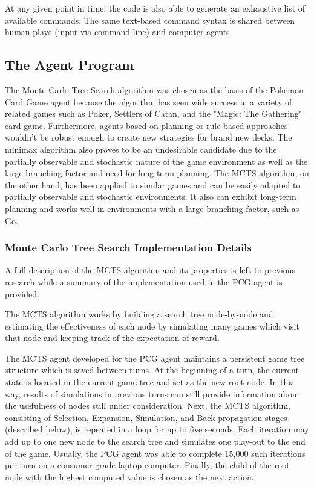 \documentclass{article}
\begin{document}
At any given point in time, the code is also able to generate an exhaustive list of available commands.  The same text-based command syntax is shared between human plays (input via command line) and computer agents

\subsection{The Agent Program} %
The Monte Carlo Tree Search algorithm was chosen as the basis of the Pokemon Card Game agent because the algorithm has seen wide success in a variety of related games such as Poker, Settlers of Catan, and the "Magic: The Gathering" card game. Furthermore, agents based on planning or rule-based approaches wouldn't be robust enough to create new strategies for brand new decks. The minimax algorithm also proves to be an undesirable candidate due to the partially observable and stochastic nature of the game environment as well as the large branching factor and need for long-term planning. The MCTS algorithm, on the other hand, has been applied to similar games and can be easily adapted to partially observable and stochastic environments. It also can exhibit long-term planning and works well in environments with a large branching factor, such as Go. 

\subsubsection{Monte Carlo Tree Search Implementation Details} %
A full description of the MCTS algorithm and its properties is left to previous research while a summary of the implementation used in the PCG agent is provided. 

The MCTS algorithm works by building a search tree node-by-node and estimating the effectiveness of each node by simulating many games which visit that node and keeping track of the expectation of reward. 

The MCTS agent developed for the PCG agent maintains a persistent game tree structure which is saved between turns. At the beginning of a turn, the current state is located in the current game tree and set as the new root node. In this way, results of simulations in previous turns can still provide information about the usefulness of nodes still under consideration. Next, the MCTS algorithm, consisting of Selection, Expansion, Simulation, and Back-propagation stages (described below), is repeated in a loop for up to five seconds. Each iteration may add up to one new node to the search tree and simulates one play-out to the end of the game. Usually, the PCG agent was able to complete 15,000 such iterations per turn on a consumer-grade laptop computer. Finally, the child of the root node with the highest computed value is chosen as the next action. 
\end{document}
